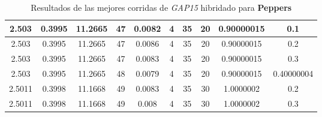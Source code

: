 \begin{table}[h!]
\begin{center}
\begin{tabular}{|c|c|c|c|c|c|c|c|c|c|}
        \hline
        \hline
            2.503 & 0.3995  & 11.2665 & 47 & 0.0082 & 4 & 35 & 20 & 0.90000015 & 0.1\\
        \hline
        \hline
            2.503 & 0.3995  & 11.2665 & 47 & 0.0086 & 4 & 35 & 20 & 0.90000015 & 0.2\\
        \hline
        \hline
            2.503 & 0.3995  & 11.2665 & 47 & 0.0083 & 4 & 35 & 20 & 0.90000015 & 0.3\\
        \hline
        \hline
            2.503 & 0.3995  & 11.2665 & 48 & 0.0079 & 4 & 35 & 20 & 0.90000015 & 0.40000004\\
        \hline
        \hline
            2.5011 & 0.3998  & 11.1668 & 49 & 0.0083 & 4 & 35 & 30 & 1.0000002 & 0.2\\
        \hline
        \hline
            2.5011 & 0.3998  & 11.1668 & 49 & 0.008 & 4 & 35 & 30 & 1.0000002 & 0.3\\
        \hline
        \end{tabular}
        \caption{Resultados de las mejores corridas de \emph{GAP15} hibridado para {\bf Peppers}}
        \label{tb:tableGAP15}
    \end{center}
\end{table}
